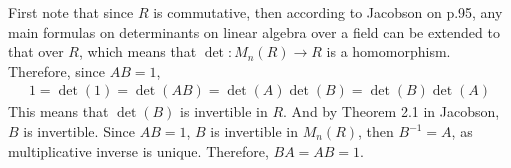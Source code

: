 \documentclass[12pt]{article}
\begin{document}
\begin{fproof}[Jacobson 2.3.2]
    First note that since \(R\) is commutative, then according to Jacobson on p.95, any main formulas on determinants on linear algebra over a field can be extended to that over \(R\), which means that \(\det: M_n(R) \to R\) is a homomorphism.
    Therefore, since \(AB = 1\), 
    \begin{align*}
        1 = \det(1)= \det(AB) = \det(A) \det(B) = \det(B)\det(A)
    \end{align*}
    This means that \(\det(B)\) is invertible in \(R\).
    And by Theorem 2.1 in Jacobson,
    \(B\) is invertible.
    Since \(AB = 1\), \(B\) is invertible in \(M_n(R)\), then \(B^{-1} = A\), as multiplicative inverse is unique.
    Therefore, \(BA = AB = 1\).
\end{fproof}
\newpage

\begin{fproof}[Jacobson 2.4.5]

\end{fproof}
\newpage

\begin{fproof}[Jacobson 2.5.2]
  
\end{fproof}
\newpage

\begin{fproof}[Jacobson 2.5.3]

\end{fproof}
\newpage

\begin{fproof}[Jacobson 2.6.4]

\end{fproof}
\newpage

\begin{fproof}[Jacobson 2.7.2]

\end{fproof}
\newpage

\begin{fproof}[Jacobson 2.7.4]

\end{fproof}
\newpage

\begin{fproof}[Jacobson 2.7.9]

\end{fproof}
\newpage

\begin{fproof}[Jacobson 2.7.10]

\end{fproof}
\end{document}
